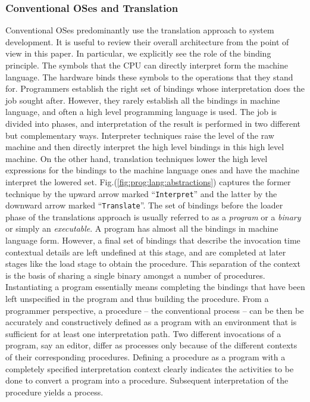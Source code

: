 \documentclass[draft]{article}
\begin{document}
\subsubsection{Conventional OSes and Translation}
\label{sec:imperative:start}

Conventional OSes predominantly use the translation approach to system
development.  It  is useful to review their  overall architecture from
the point of view in this paper.  In particular, we explicitly see the
role of the binding principle.   The symbols that the CPU can directly
interpret form the machine language.  The hardware binds these symbols
to  the operations  that they  stand for.   Programmers  establish the
right set of bindings whose  interpretation does the job sought after.
However, they  rarely establish all the bindings  in machine language,
and  often a  high level  programming language  is used.   The  job is
divided into phases, and interpretation  of the result is performed in
two  different but complementary  ways.  Interpreter  techniques raise
the  level of the  raw machine  and then  directly interpret  the high
level  bindings  in this  high  level  machine.   On the  other  hand,
translation  techniques  lower  the  high level  expressions  for  the
bindings to the  machine language ones and have  the machine interpret
the lowered  set.  Fig.(\ref{fig:prog:lang:abstractions}) captures the
former technique by the upward arrow marked ``\texttt{Interpret}'' and
the latter  by the downward arrow  marked ``\texttt{Translate}''.  The
set of bindings  before the loader phase of  the translations approach
is  usually referred  to as  a  \emph{program} or  a \emph{binary}  or
simply an \emph{executable}.  A program has almost all the bindings in
machine language form.  However, a final set of bindings that describe
the  invocation time  contextual details  are left  undefined  at this
stage, and are completed at later stages like the load stage to obtain
the procedure.  This separation of the context is the basis of sharing
a  single binary  amongst  a number  of  procedures.  Instantiating  a
program essentially means completing  the bindings that have been left
unspecified in  the program and  thus building the procedure.   From a
programmer perspective, a procedure -- the conventional process -- can
be then be accurately and  constructively defined as a program with an
environment that  is sufficient for at least  one interpretation path.
Two  different invocations  of a  program,  say an  editor, differ  as
processes   only  because   of   the  different   contexts  of   their
corresponding procedures.   Defining a procedure  as a program  with a
completely  specified  interpretation  context clearly  indicates  the
activities  to  be  done  to  convert  a  program  into  a  procedure.
Subsequent interpretation of the procedure yields a process.
\end{document}

